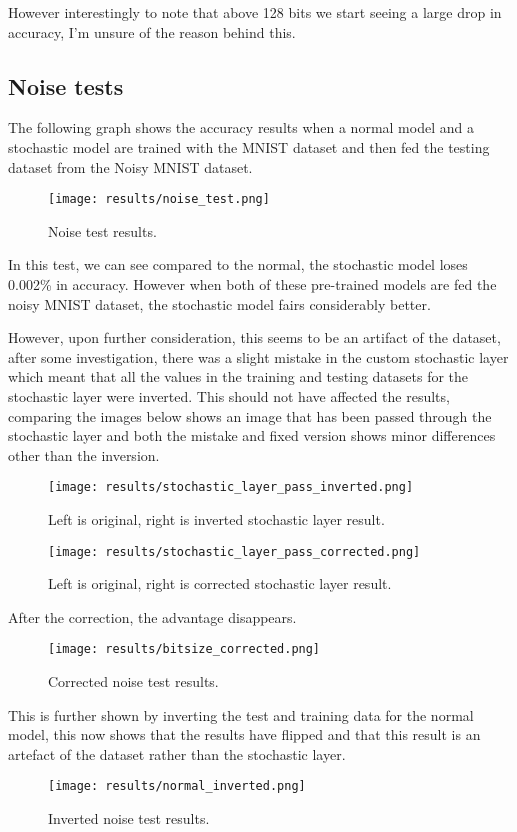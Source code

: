 \documentclass[a4paper,oneside,phd,etd]{BYUPhys}
\begin{document}
However interestingly to note that above 128 bits we start seeing a large drop in accuracy, I'm unsure of the reason behind this.

\subsection{Noise tests}
The following graph shows the accuracy results when a normal model and a stochastic model are trained with the MNIST dataset and then fed the testing dataset from the Noisy MNIST dataset.
\begin{figure}[H]
\centering
\texttt{[image: results/noise\_test.png]}
\caption{Noise test results.}
\label{fig:noise}
\end{figure}
In this test, we can see compared to the normal, the stochastic model loses 0.002\% in accuracy. However when both of these pre-trained models are fed the noisy MNIST dataset, the stochastic model fairs considerably better.

However, upon further consideration, this seems to be an artifact of the dataset, after some investigation, there was a slight mistake in the custom stochastic layer which meant that all the values in the training and testing datasets for the stochastic layer were inverted. 
This should not have affected the results, comparing the images below shows an image that has been passed through the stochastic layer and both the mistake and fixed version shows minor differences other than the inversion.
\begin{figure}[H]
\centering
\texttt{[image: results/stochastic\_layer\_pass\_inverted.png]}
\caption{Left is original, right is inverted stochastic layer result.}
\label{fig:noise_stochastic_inverted}
\end{figure}

\begin{figure}[H]
\centering
\texttt{[image: results/stochastic\_layer\_pass\_corrected.png]}
\caption{Left is original, right is corrected stochastic layer result.}
\label{fig:noise_stochastic}
\end{figure}

After the correction, the advantage disappears.
\begin{figure}[H]
\centering
\texttt{[image: results/bitsize\_corrected.png]}
\caption{Corrected noise test results.}
\label{fig:noise_corrected}
\end{figure}

This is further shown by inverting the test and training data for the normal model, this now shows that the results have flipped and that this result is an artefact of the dataset rather than the stochastic layer.
\begin{figure}[H]
\centering
\texttt{[image: results/normal\_inverted.png]}
\caption{Inverted noise test results.}
\label{fig:noise_normal_inverted}
\end{figure}
\end{document}
